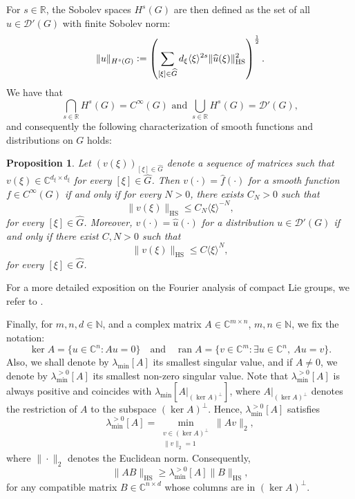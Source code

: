 \documentclass[11pt]{amsart}
\numberwithin{theorem}{section}
\numberwithin{equation}{section}
\newtheorem{prop}[theorem]{Proposition}
\theoremstyle{definition}
\numberwithin{example}{section}
\theoremstyle{definition}
\theoremstyle{definition}
\newcommand{\R}{\mathbb{R}}
\newcommand{\N}{\mathbb{N}}
\newcommand{\C}{\mathbb{C}}
\newcommand{\HS}{\operatorname{HS}}
\begin{document}
For $s\in\R$, the Sobolev spaces $H^s(G)$ are then defined as the set of all $u\in\mathcal{D}'(G)$ with finite Sobolev norm:
\begin{equation*} \|u\|_{H^s(G)}\vcentcolon=\left(\sum_{[\xi]\in\widehat{G}}d_\xi \langle \xi\rangle^{2s} \|\widehat{u}(\xi)\|_{\HS}^2\right)^{\frac{1}{2}}.
\end{equation*}
We have that 
\begin{equation*}
     \bigcap_{s\in\R} H^s(G)=C^\infty(G) \text{ and } \bigcup_{s\in\R} H^s(G)=\mathcal{D}'(G),
\end{equation*}
and consequently the following characterization of smooth functions and distributions on $G$ holds:
\begin{prop}\label{prop_charact_smooth_and_dis}
    Let $({v}(\xi))_{[\xi]\in\widehat{G}}$ denote a sequence of matrices such that $v(\xi)\in \C^{d_\xi\times d_\xi}$ for every $[\xi]\in\widehat{G}$. Then $v(\cdot)=\widehat{f}(\cdot)$ for a smooth function $f\in C^\infty(G)$ if and only if for every $N>0$, there exists $C_N>0$ such that
    \begin{equation*}
        \|v(\xi)\|_{\HS}\leq C_N\langle \xi\rangle^{-N},
    \end{equation*}
    for every $[\xi]\in\widehat{G}$. Moreover, $v(\cdot)=\widehat{u}(\cdot)$ for a distribution $u\in \mathcal{D}'(G)$ if and only if there exist $C,N>0$ such that
    \begin{equation*}
         \|v(\xi)\|_{\HS}\leq C\langle \xi\rangle^{N},
    \end{equation*}
     for every $[\xi]\in\widehat{G}$. 
\end{prop}
For a more detailed exposition on the Fourier analysis of compact Lie groups, we refer to \cite{RT2010_book}.

Finally, for $m,n,d\in\N$, and a complex matrix $A\in \C^{m\times n}$, $m,n\in\N$, we fix the notation:
\begin{equation*}
    \ker A=\Big\{ u\in \C^{n}:Au=0\Big\}\quad \text{and}\quad \operatorname{ran}A=\Big\{v\in\C^{m}:\exists u\in \C^n,\ Au=v\Big\}.
\end{equation*}
Also, we shall denote by $\lambda_{\min}[A]$ its smallest singular value, and if $A\neq 0$, we denote by $\lambda_{\min}^{>0}[A]$ its smallest non-zero singular value. Note that $\lambda_{\min}^{>0}[A]$ is always positive and coincides with $\lambda_{\min}[A|_{(\ker A)^\perp}]$, where $A|_{(\ker A)^\perp}$ denotes the restriction of $A$ to the subspace $(\ker A)^\perp$. Hence, $\lambda_{\min}^{>0}[A]$ satisfies 
\begin{equation*}
    \lambda_{\min}^{>0}[A]=\min_{\substack{v\in (\ker A)^\perp\\\|v\|_2=1}} \|Av\|_2,
\end{equation*}
where $\|\cdot\|_{2}$ denotes the Euclidean norm. Consequently,
\begin{equation*}
    \|AB\|_{\HS}\geq \lambda_{\min}^{>0}[A]\|B\|_{\HS},
\end{equation*}
for any compatible matrix $B\in\C^{n\times d}$ whose columns are in $(\ker A)^\perp$. 
\end{document}
